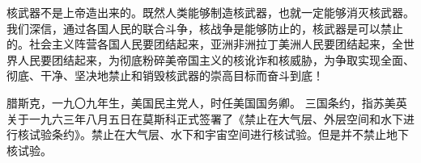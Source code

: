 核武器不是上帝造出来的。既然人类能够制造核武器，也就一定能够消灭核武器。我们深信，通过各国人民的联合斗争，核战争是能够防止的，核武器是可以禁止的。社会主义阵营各国人民要团结起来，亚洲非洲拉丁美洲人民要团结起来，全世界人民要团结起来，为彻底粉碎美帝国主义的核讹诈和核威胁，为争取实现全面、彻底、干净、坚决地禁止和销毁核武器的崇高目标而奋斗到底！

\begin{maonote}
腊斯克，一九〇九年生，美国民主党人，时任美国国务卿。
三国条约，指苏美英关于一九六三年八月五日在莫斯科正式签署了《禁止在大气层、外层空间和水下进行核试验条约》。禁止在大气层、水下和宇宙空间进行核试验。但是并不禁止地下核试验。
\end{maonote}
